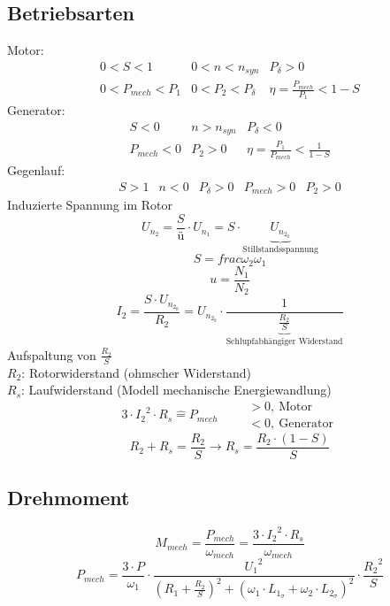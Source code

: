 \subsection{Betriebsarten}
Motor: 
\[ \begin{array}{llllll}
0 < S < 1 
  & 0 < n < n_{syn} 
  & P_\delta > 0 
  \\ 0 < P_{mech} < P_1 
  & 0 < P_2 < P_\delta 
  & \eta = \frac{P_{mech}}{P_1} < 1 - S
\end{array} \]
Generator: 
\[ \begin{array}{llllll}
S < 0 
  & n > n_{syn} 
  & P_\delta < 0 
  \\ P_{mech} < 0 
  & P_2 > 0
  & \eta = \frac{P_1}{P_{mech}} < \frac{1}{1 - S}
\end{array} \]
Gegenlauf: 
\[ \begin{array}{llllll}
S > 1 
  & n < 0
  & P_\delta > 0 
  & P_{mech} > 0
  & P_2 > 0
\end{array} \]
Induzierte Spannung im Rotor
\[ U_{n_2} = \frac{S}{ü} \cdot U_{n_1} = S \cdot \underbrace{U_{n_{2_0}}}_
{\text{Stillstandsspannung}} \]
\[ S = frac{\omega_2}{\omega_1} \]
\[ u = \frac{N_1}{N_2} \]
\[ I_2 = \frac{S \cdot U_{n_{2_0}}}{R_2} = U_{n_{2_0}} \cdot 
\frac{1}{\underbrace{\frac{R_2}{S}}_{\text{Schlupfabhängiger Widerstand}}} \]
Aufspaltung von $\frac{R_2}{S}$\\
$R_2$: Rotorwiderstand (ohmscher Widerstand)\\
$R_s$: Laufwiderstand (Modell mechanische Energiewandlung)
\[ 3 \cdot {I_2}^2 \cdot R_s \hat{=} P_{mech} 
\qquad \begin{array}{l}>0,~\text{Motor}\\<0,~\text{Generator}\end{array} \]
\[ R_2 + R_s = \frac{R_2}{S} \rightarrow R_s = \frac{R_2 \cdot (1 - S)}{S} \]

\subsection{Drehmoment}
\[ M_{mech} = \frac{P_{mech}}{\omega_{mech}} 
= \frac{3 \cdot {I_2}^2 \cdot R_s}{\omega_{mech}} \]
\[ P_{mech} = \frac{3 \cdot P}{\omega_1} \cdot 
\frac{{U_1}^2}{\left(R_1 + \frac{R_2}{S}\right)^2 + 
(\omega_1 \cdot L_{1_\sigma} + \omega_2 \cdot L_{2_\sigma})^2} \cdot 
\frac{{R_2}^2}{S} \]
